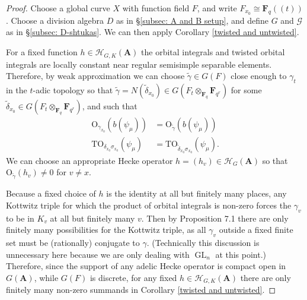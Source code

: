 \documentclass[reqno]{amsart}
\numberwithin{equation}{section}
\newcommand{\F}{\mathbf{F}}
\newcommand{\wt}[1]{\widetilde{#1}}
\newcommand{\Cal}[1]{\mathcal{#1}}
\newcommand{\A}{\mathbf{A}}
\newcommand{\mrm}[1]{\mathrm{#1}}
\DeclareMathOperator{\GL}{GL}
\theoremstyle{remark}
\numberwithin{equation}{section}
\begin{document}
\begin{proof}
Choose a global curve $X$ with function field $F$, and write $F_{x_0} \cong \F_q((t))$. Choose a division algebra $D$ as in \S \ref{subsec: A and B setup}, and define $G$ and $\Cal{G}$ as in \S \ref{subsec: D-shtukas}. We can then apply Corollary \ref{twisted and untwisted}. 

For a fixed function $h \in \Cal{H}_{G,K}(\A)$ the orbital integrals and twisted orbital integrals are locally constant near regular semisimple separable elements. Therefore, by weak approximation we can choose $\wt{\gamma} \in G(F)$ close enough to $\gamma_t$ in the $t$-adic topology so that $\wt{\gamma} = N(\wt{\delta}_{x_0}) \in G(F_t \otimes_{\F_q} \F_{q^r})$ for some $\wt{\delta}_{x_0} \in G(F_t \otimes_{\F_q} \F_{q^r})$, and such that   
\begin{align*}
 \mrm{O}_{\gamma_{x_0}}(b(\psi_{\mu})) &=  \mrm{O}_{\wt{\gamma}}(b(\psi_{\mu})) \\
 \mrm{TO}_{\delta_{x_0} \sigma_{x_0} }(\psi_{\mu}) &=  \mrm{TO}_{\wt{\delta}_{x_0} \sigma_{x_0}}(\psi_{\mu}).
\end{align*}
We can choose an appropriate Hecke operator $h = (h_v) \in \Cal{H}_G(\A)$ so that $\mrm{O}_{\wt{\gamma}}(h_v) \neq 0$ for $v \neq x$. 

Because a fixed choice of $h$ is the identity at all but finitely many places, any Kottwitz triple for which the product of orbital integrals is non-zero forces the $\gamma_v$ to be in $K_v$ at all but finitely many $v$. Then by \cite{Kott86} Proposition 7.1 there are only finitely many possibilities for the Kottwitz triple, as all $\gamma_v$ outside a fixed finite set must be (rationally) conjugate to $\gamma$. (Technically this discussion is unnecessary here because we are only dealing with $\GL_n$ at this point.) Therefore, since the support of any adelic Hecke operator is compact open in $G(\A)$, while $G(F)$ is discrete, for any fixed $h \in \Cal{H}_{G,K}(\A)$ there are only finitely many non-zero summands in Corollary \ref{twisted and untwisted}. 


\end{proof}
\end{document}
